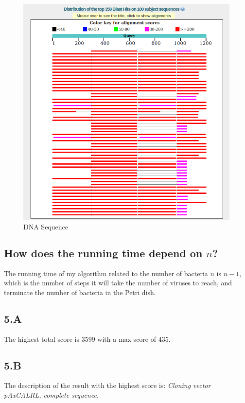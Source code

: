 \documentclass{article}
\begin{document}
\begin{figure}[H]
\begin{center}
\includegraphics[scale = .4]{Dinosaur}
\end{center}
\caption{DNA Sequence}
\end{figure}

\subsection*{How does the running time depend on $n$?}

The running time of my algorithm related to the number of bacteria $n$ is $n-1$, which is the number of steps it will take the number of viruses to reach, and terminate the number of bacteria in the Petri dish.

\subsection*{5.A}
The highest total score is $3599$ with a max score of $435$.

\subsection*{5.B}
The description of the result with the highest score is: \textit{Cloning vector pAxCALRL, complete sequence}.
\end{document}
